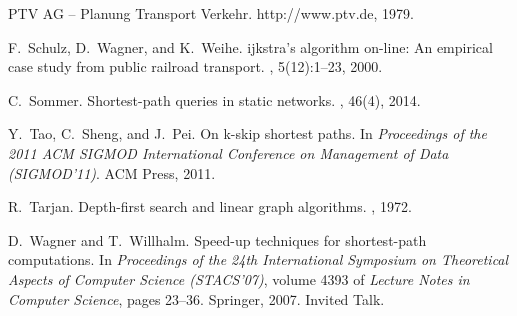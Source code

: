 \documentclass{sig-alternate}
\begin{document}
\begin{thebibliography}{10}
{PTV AG -- Planung Transport Verkehr}.
\newblock http://www.ptv.de, 1979.

F.~Schulz, D.~Wagner, and K.~Weihe.
ijkstra's algorithm on-line: An empirical case study from public
  railroad transport.
, 5(12):1--23, 2000.

C.~Sommer.
\newblock Shortest-path queries in static networks.
, 46(4), 2014.

Y.~Tao, C.~Sheng, and J.~Pei.
\newblock On k-skip shortest paths.
\newblock In {\em Proceedings of the 2011 ACM SIGMOD International Conference
  on Management of Data (SIGMOD'11)}. ACM Press, 2011.

R.~Tarjan.
\newblock Depth-first search and linear graph algorithms.
, 1972.

D.~Wagner and T.~Willhalm.
\newblock Speed-up techniques for shortest-path computations.
\newblock In {\em Proceedings of the 24th International Symposium on
  Theoretical Aspects of Computer Science (STACS'07)}, volume 4393 of {\em
  Lecture Notes in Computer Science}, pages 23--36. Springer, 2007.
\newblock Invited Talk.

\end{thebibliography}
\balance
\end{document}
